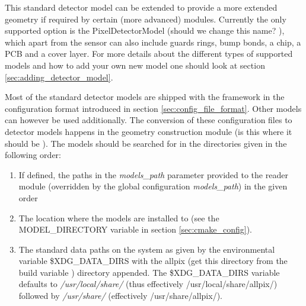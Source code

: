 This standard detector model can be extended to provide a more extended geometry if required by certain (more advanced) modules. Currently the only supported option is the PixelDetectorModel (\todo should we change this name? \todo), which apart from the sensor can also include guards rings, bump bonds, a chip, a PCB and a cover layer. For more details about the different types of supported models and how to add your own new model one should look at section \ref{sec:adding_detector_model}.

Most of the standard detector models are shipped with the framework in the configuration format introduced in section \ref{sec:config_file_format}. Other models can however be used additionally. The conversion of these configuration files to detector models happens in the geometry construction module (\todo is this where it should be \todo). The models should be searched for in the directories given in the following order:
\begin{enumerate}
\item If defined, the paths in the \textit{models\_path} parameter provided to the reader module (overridden by the global configuration \textit{models\_path}) in the given order
\item The location where the models are installed to (see the MODEL\_DIRECTORY variable in section \ref{sec:cmake_config}). 
\item The standard data paths on the system as given by the environmental variable \$XDG\_DATA\_DIRS with the allpix (\todo get this directory from the build variable \todo) directory appended. The \$XDG\_DATA\_DIRS variable defaults to \textit{/usr/local/share/} (thus effectively /usr/local/share/allpix/) followed by \textit{/usr/share/} (effectively /usr/share/allpix/).
\end{enumerate}


